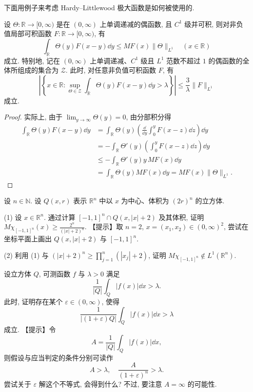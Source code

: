 下面用例子来考虑 Hardy--Littlewood 极大函数是如何被使用的.

\begin{lemma}\label{lem:3.1}
设 $\Theta: \mathbb{R} \to [0, \infty)$ 是在 $(0, \infty)$ 上单调递减的偶函数, 且 $C^{1}$ 级并可积, 则对非负值局部可积函数 $F: \mathbb{R} \to [0, \infty)$, 有
\[
\int_{\mathbb{R}}\Theta(y)F(x-y)\dd y \leq MF(x)\|\Theta\|_{L^{1}} \quad (x \in \mathbb{R})
\]
成立. 特别地, 记在 $(0, \infty)$ 上单调递减、$C^{1}$ 级且 $L^{1}$ 范数不超过 $1$ 的偶函数的全体所组成的集合为 $\mathcal{Z}$. 此时, 对任意非负值可积函数 $F$, 有
\[
\left|\left\{x \in \mathbb{R}: \sup_{\Theta \in \mathcal{Z}}\int_{\mathbb{R}}\Theta(y)F(x-y)\dd y > \lambda\right\}\right| \leq \frac{3}{\lambda}\|F\|_{L^{1}}
\]
成立.
\end{lemma}

\begin{proof}
实际上, 由于 $\lim_{y \to \infty}\Theta(y) = 0$, 由分部积分得
\begin{align*}
\int_{\mathbb{R}}\Theta(y)F(x-y)\dd y &= \int_{\mathbb{R}}\Theta(y)\left(\frac{\dd}{\dd y}\int_{0}^{y}F(x-z)\dd z\right)\dd y \\
&= -\int_{\mathbb{R}}\Theta'(y)\left(\int_{0}^{y}F(x-z)\dd z\right)\dd y \\
&\leq -\int_{\mathbb{R}}\Theta'(y)y\,MF(x)\dd y \\
&= \int_{\mathbb{R}}\Theta(y)MF(x)\dd y = MF(x)\|\Theta\|_{L^{1}}.
\end{align*}
\end{proof}

\begin{exercise}\label{exer:3.1}
设 $n \in \mathbb{N}$. 设 $Q(x, r)$ 表示 $\mathbb{R}^{n}$ 中以 $x$ 为中心、体积为 $(2r)^{n}$ 的立方体.

(1) 设 $x \in \mathbb{R}^{n}$. 通过计算 $[-1,1]^{n} \cap Q(x, |x|+2)$ 及其体积, 证明 $M\chi_{[-1,1]^{n}}(x) \geq \frac{2^{n}}{(|x|+2)^{n}}$. 【提示】取 $n = 2$, $x = (x_{1}, x_{2}) \in (0, \infty)^{2}$, 尝试在坐标平面上画出 $Q(x, |x|+2)$ 与 $[-1,1]^{n}$.

(2) 利用 (1) 与 $(|x|+2)^{n} \geq \prod_{j=1}^{n}(|x_{j}|+2)$, 证明 $M\chi_{[-1,1]^{n}} \notin L^{1}(\mathbb{R}^{n})$.
\end{exercise}

\begin{exercise}\label{exer:3.2}
设立方体 $Q$, 可测函数 $f$ 与 $\lambda > 0$ 满足
\[
\frac{1}{|Q|}\int_{Q}|f(x)|\dd x > \lambda.
\]
此时, 证明存在某个 $\varepsilon \in (0, \infty)$, 使得
\[
\frac{1}{|(1+\varepsilon)Q|}\int_{Q}|f(x)|\dd x > \lambda
\]
成立. 【提示】令
\[
A = \frac{1}{|Q|}\int_{Q}|f(x)|\dd x,
\]
则假设与应当判定的条件分别可读作
\[
A > \lambda, \quad \frac{A}{(1+\varepsilon)^{n}} > \lambda.
\]
尝试关于 $\varepsilon$ 解这个不等式, 会得到什么? 不过, 要注意 $A = \infty$ 的可能性.
\end{exercise}

